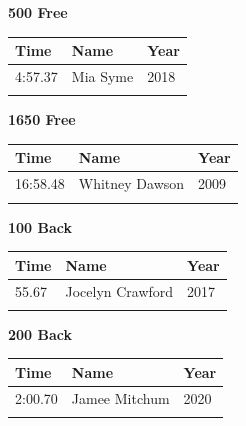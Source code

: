 \hfill
\begin{minipage}[t]{0.48\textwidth}
\centering
\textbf{\textcolor{teamprimary}{500 Free}}\par
\vspace{0.5em}
\centering
\small
\renewcommand{\arraystretch}{1.0}
\setlength{\tabcolsep}{4pt}
\begin{tabular}{@{}p{1.8cm}p{3.0cm}p{1.0cm}@{}}
\toprule
\textbf{Time} & \textbf{Name} & \textbf{Year} \\
\midrule
4:57.37 & Mia Syme & 2018 \\
\bottomrule
\vspace{0.5em}
\end{tabular}
\end{minipage}
\vspace{1.2em}
\noindent\begin{minipage}[t]{0.48\textwidth}
\centering
\textbf{\textcolor{teamprimary}{1650 Free}}\par
\vspace{0.5em}
\centering
\small
\renewcommand{\arraystretch}{1.0}
\setlength{\tabcolsep}{4pt}
\begin{tabular}{@{}p{1.8cm}p{3.0cm}p{1.0cm}@{}}
\toprule
\textbf{Time} & \textbf{Name} & \textbf{Year} \\
\midrule
16:58.48 & Whitney Dawson & 2009 \\
\bottomrule
\vspace{0.5em}
\end{tabular}
\end{minipage}
\hfill
\begin{minipage}[t]{0.48\textwidth}
\centering
\textbf{\textcolor{teamprimary}{100 Back}}\par
\vspace{0.5em}
\centering
\small
\renewcommand{\arraystretch}{1.0}
\setlength{\tabcolsep}{4pt}
\begin{tabular}{@{}p{1.8cm}p{3.0cm}p{1.0cm}@{}}
\toprule
\textbf{Time} & \textbf{Name} & \textbf{Year} \\
\midrule
55.67 & Jocelyn Crawford & 2017 \\
\bottomrule
\vspace{0.5em}
\end{tabular}
\end{minipage}
\vspace{1.2em}
\noindent\begin{minipage}[t]{0.48\textwidth}
\centering
\textbf{\textcolor{teamprimary}{200 Back}}\par
\vspace{0.5em}
\centering
\small
\renewcommand{\arraystretch}{1.0}
\setlength{\tabcolsep}{4pt}
\begin{tabular}{@{}p{1.8cm}p{3.0cm}p{1.0cm}@{}}
\toprule
\textbf{Time} & \textbf{Name} & \textbf{Year} \\
\midrule
2:00.70 & Jamee Mitchum & 2020 \\
\bottomrule
\vspace{0.5em}
\end{tabular}
\end{minipage}
